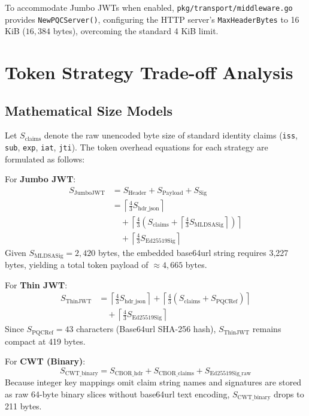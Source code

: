 \documentclass[conference]{IEEEtran}
\begin{document}
To accommodate Jumbo JWTs when enabled, \texttt{pkg/transport/middleware.go} provides \texttt{NewPQCServer()}, configuring the HTTP server's \texttt{MaxHeaderBytes} to 16 KiB ($16,384$ bytes), overcoming the standard 4 KiB limit.

\section{Token Strategy Trade-off Analysis}

\subsection{Mathematical Size Models}
Let $S_{\text{claims}}$ denote the raw unencoded byte size of standard identity claims (\texttt{iss}, \texttt{sub}, \texttt{exp}, \texttt{iat}, \texttt{jti}). The token overhead equations for each strategy are formulated as follows:

For \textbf{Jumbo JWT}:
\begin{align}
S_{\text{JumboJWT}} &= S_{\text{Header}} + S_{\text{Payload}} + S_{\text{Sig}} \nonumber \\
&= \left\lceil \frac{4}{3} S_{\text{hdr\_json}} \right\rceil \nonumber \\
&\quad + \left\lceil \frac{4}{3} \left( S_{\text{claims}} + \left\lceil \frac{4}{3} S_{\text{MLDSASig}} \right\rceil \right) \right\rceil \nonumber \\
&\quad + \left\lceil \frac{4}{3} S_{\text{Ed25519Sig}} \right\rceil
\end{align}
Given $S_{\text{MLDSASig}} = 2,420$ bytes, the embedded base64url string requires 3,227 bytes, yielding a total token payload of $\approx 4,665$ bytes.

For \textbf{Thin JWT}:
\begin{align}
S_{\text{ThinJWT}} &= \left\lceil \frac{4}{3} S_{\text{hdr\_json}} \right\rceil + \left\lceil \frac{4}{3} \left( S_{\text{claims}} + S_{\text{PQCRef}} \right) \right\rceil \nonumber \\
&\quad + \left\lceil \frac{4}{3} S_{\text{Ed25519Sig}} \right\rceil
\end{align}
Since $S_{\text{PQCRef}} = 43$ characters (Base64url SHA-256 hash), $S_{\text{ThinJWT}}$ remains compact at 419 bytes.

For \textbf{CWT (Binary)}:
\begin{equation}
S_{\text{CWT\_binary}} = S_{\text{CBOR\_hdr}} + S_{\text{CBOR\_claims}} + S_{\text{Ed25519Sig\_raw}}
\end{equation}
Because integer key mappings omit claim string names and signatures are stored as raw 64-byte binary slices without base64url text encoding, $S_{\text{CWT\_binary}}$ drops to 211 bytes.
\end{document}
